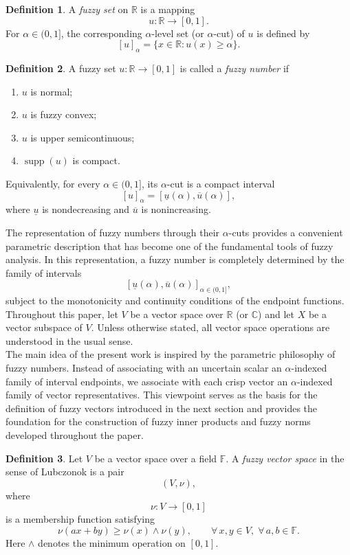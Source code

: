 \documentclass[preprint,12pt]{elsarticle}
\theoremstyle{definition}
\newtheorem{definition}{Definition}[section]
\begin{document}
\begin{definition} \cite{zadeh1965fuzzy} A \emph{fuzzy set} on $\mathbb{R}$ is a mapping \[ u:\mathbb{R}\rightarrow[0,1]. \] For $\alpha\in(0,1]$, the corresponding $\alpha$-level set (or $\alpha$-cut) of $u$ is defined by \[ [u]_\alpha=	
	\{x\in\mathbb{R}:u(x)\ge\alpha\}. \] \end{definition}
\begin{definition}A fuzzy set $u:\mathbb{R}\rightarrow[0,1]$ is called a \emph{fuzzy number} if
	\begin{enumerate} \item $u$ is normal; \item $u$ is fuzzy convex; \item $u$ is upper semicontinuous; \item $\operatorname{supp}(u)$ is compact. \end{enumerate}
	
	Equivalently, for every $\alpha\in(0,1]$, its $\alpha$-cut is a compact interval \[ [u]_\alpha=
	[\underline{u}(\alpha),\overline{u}(\alpha)], \] where $\underline{u}$ is nondecreasing and $\overline{u}$ is nonincreasing. \end{definition}
The representation of fuzzy numbers through their $\alpha$-cuts provides a convenient parametric description that has become one of the fundamental tools of fuzzy analysis. In this representation, a fuzzy number is completely determined by the family of intervals \[ {[\underline{u}(\alpha),\overline{u}(\alpha)]}_{\alpha\in(0,1]}, \] subject to the monotonicity and continuity conditions of the endpoint functions.
Throughout this paper, let $V$ be a vector space over $\mathbb{R}$ (or $\mathbb{C}$) and let $X$ be a vector subspace of $V$. Unless otherwise stated, all vector space operations are understood in the usual sense.\\
The main idea of the present work is inspired by the parametric philosophy of fuzzy numbers. Instead of associating with an uncertain scalar an $\alpha$-indexed family of interval endpoints, we associate with each crisp vector an $\alpha$-indexed family of vector representatives. This viewpoint serves as the basis for the definition of fuzzy vectors introduced in the next section and provides the foundation for the construction of fuzzy inner products and fuzzy norms developed throughout the paper.
\begin{definition}\cite{Lubczonok1990}
	Let \(V\) be a vector space over a field \(\mathbb{F}\).
	A \emph{fuzzy vector space} in the sense of Lubczonok is a pair
	\[
	(V,\nu),
	\]
	where
	\[
	\nu:V\longrightarrow[0,1]
	\]
	is a membership function satisfying
	\[
	\nu(ax+by)\ge
	\nu(x)\wedge\nu(y),
	\qquad
	\forall\,x,y\in V,\;
	\forall\,a,b\in\mathbb{F}.
	\]
	Here \(\wedge\) denotes the minimum operation on \([0,1]\).
	

\end{definition}
\end{document}
